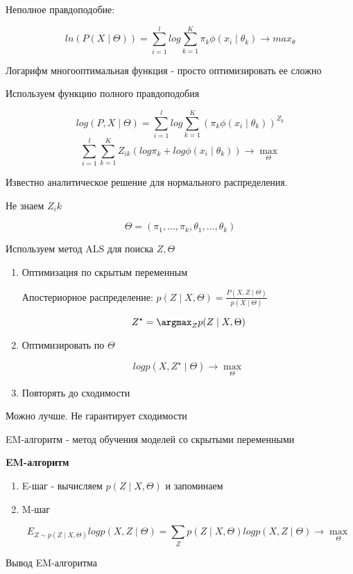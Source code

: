 \documentclass[a4paper, 12pt]{article}
\begin{document}
Неполное правдоподобие:

\[ln(P(X \mid \Theta)) = \sum_{i = 1}^{l} log \sum_{k = 1}^K \pi_k \phi(x_i \mid \theta_k) \rightarrow max_{\theta}\]

Логарифм многооптимальная функция - просто оптимизировать ее сложно

Используем функцию полного правдоподобия

\[log(P, X \mid \Theta) = \sum_{i = 1}^{l} log \sum_{k = 1}^{K} (\pi_k \phi(x_i \mid \theta_k))^{Z_k}\]
\[\sum_{i = 1}^{l}\sum_{k = 1}^{K} Z_{ik}(log\pi_k + log\phi(x_i \mid \theta_k)) \rightarrow \max_{\Theta}\]

Известно аналитическое решение для нормального распределения.

Не знаем $Z_ik$

\[\Theta = (\pi_1, \ldots, \pi_k, \theta_1, \ldots, \theta_k)\]

Используем метод ALS для поиска $Z, \Theta$

\begin{enumerate}
    \item Оптимизация по скрытым переменным
    
    Апостериорное распределение: \(p(Z \mid X, \Theta) = \frac{P(X, Z \mid \Theta)}{p(X \mid \Theta)}\)

    \[Z^{\star} = \argmax_{Z} p(Z \mid X, \Theta)\]

    \item Оптимизировать по $\Theta$
    
    \[log p(X, Z^{\star} \mid \Theta) \rightarrow \max_{\Theta}\]
    \item Повторять до сходимости
\end{enumerate}

Можно лучше. Не гарантирует сходимости


EM-алгоритм - метод обучения моделей со скрытыми переменными

\textbf{EM-алгоритм}

\begin{enumerate}
    \item E-шаг - вычисляем $p(Z \mid X, \Theta)$ и запоминаем
    \item M-шаг
    
    \[E_{Z \sim p(Z \mid X, \Theta)}log p(X, Z \mid \Theta) = 
    \sum_{Z} p(Z \mid X, \Theta)log p(X, Z \mid \Theta) 
    \rightarrow \max_{\Theta}\]
\end{enumerate}

Вывод EM-алгоритма
\end{document}
